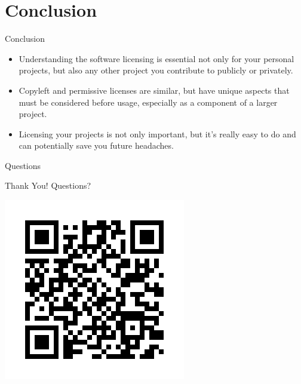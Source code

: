 \documentclass[9pt, dvipsnames]{beamer}
\begin{document}
\section{Conclusion}
\begin{frame}{Conclusion}
    \begin{itemize}
        \item Understanding the software licensing is essential not only for
        your personal projects, but also any other project you contribute to
        publicly or privately.
        \item Copyleft and permissive licenses are similar, but have unique
        aspects that must be considered before usage, especially as a component
        of a larger project.
        \item Licensing your projects is not only important, but it's really
        easy to do and can potentially save you future headaches.
    \end{itemize}
\end{frame}

\begin{frame}{Questions}
    \begin{center}
        {\huge Thank You! Questions?}
        \begin{center}
            \includegraphics[width=0.4\linewidth]{assets/frame.png}
        \end{center}
    \end{center}
\end{frame}
\end{document}
